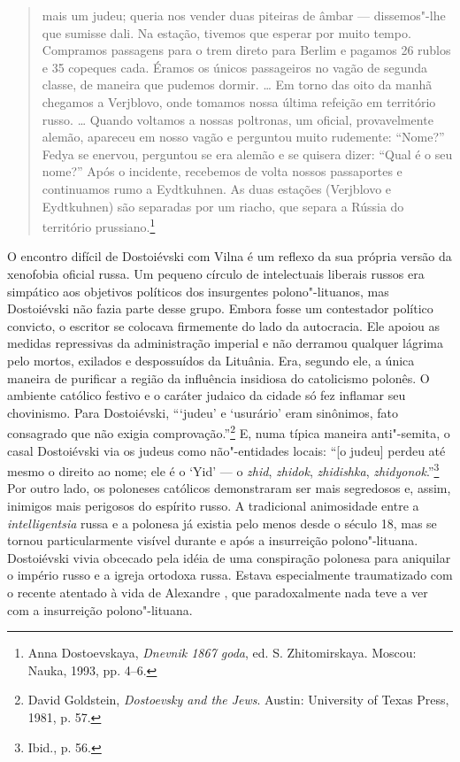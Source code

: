\begin{quote}
mais um judeu; queria nos vender duas piteiras de âmbar --- dissemos"-lhe
que sumisse dali. Na estação, tivemos que esperar por muito tempo.
Compramos passagens para o trem direto para Berlim e pagamos 26 rublos e
35 copeques cada. Éramos os únicos passageiros no vagão de segunda
classe, de maneira que pudemos dormir. \ldots{} Em torno das oito da
manhã chegamos a Verjblovo, onde tomamos nossa última refeição em
território russo. \ldots{} Quando voltamos a nossas poltronas, um
oficial, provavelmente alemão, apareceu em nosso vagão e perguntou muito
rudemente: ``Nome?'' Fedya se enervou, perguntou se era alemão e se
quisera dizer: ``Qual é o seu nome?'' Após o incidente, recebemos de
volta nossos passaportes e continuamos rumo a Eydtkuhnen. As duas
estações (Verjblovo e Eydtkuhnen) são separadas por um riacho, que
separa a Rússia do território prussiano.\footnote{Anna Dostoevskaya,
  \emph{Dnevnik 1867 goda}, ed. S. Zhitomirskaya. Moscou: Nauka, 1993,
  pp. 4--6.}
\end{quote}

O encontro difícil de Dostoiévski com Vilna é um reflexo da sua própria
versão da xenofobia oficial russa. Um pequeno círculo de intelectuais
liberais russos era simpático aos objetivos políticos dos insurgentes
polono"-lituanos, mas Dostoiévski não fazia parte desse grupo. Embora
fosse um contestador político convicto, o escritor se colocava
firmemente do lado da autocracia. Ele apoiou as medidas repressivas da
administração imperial e não derramou qualquer lágrima pelo mortos,
exilados e despossuídos da Lituânia. Era, segundo ele, a única maneira
de purificar a região da influência insidiosa do catolicismo polonês. O
ambiente católico festivo e o caráter judaico da cidade só fez inflamar
seu chovinismo. Para Dostoiévski, ```judeu' e `usurário' eram sinônimos,
fato consagrado que não exigia comprovação.''\footnote{David Goldstein,
  \emph{Dostoevsky and the Jews}. Austin: University of Texas Press,
  1981, p. 57.} E, numa típica maneira anti"-semita, o casal Dostoiévski
via os judeus como não"-entidades locais: ``{[}o judeu{]} perdeu até
mesmo o direito ao nome; ele é o `Yid' --- o \emph{zhid}, \emph{zhidok},
\emph{zhidishka}, \emph{zhidyonok}.''\footnote{Ibid., p. 56.} Por outro
lado, os poloneses católicos demonstraram ser mais segredosos e, assim,
inimigos mais perigosos do espírito russo. A tradicional animosidade
entre a \emph{intelligentsia} russa e a polonesa já existia pelo menos
desde o século 18, mas se tornou particularmente visível durante e após
a insurreição polono"-lituana. Dostoiévski vivia obcecado pela idéia de
uma conspiração polonesa para aniquilar o império russo e a igreja
ortodoxa russa. Estava especialmente traumatizado com o recente atentado
à vida de Alexandre , que paradoxalmente nada teve a ver com a
insurreição polono"-lituana.

